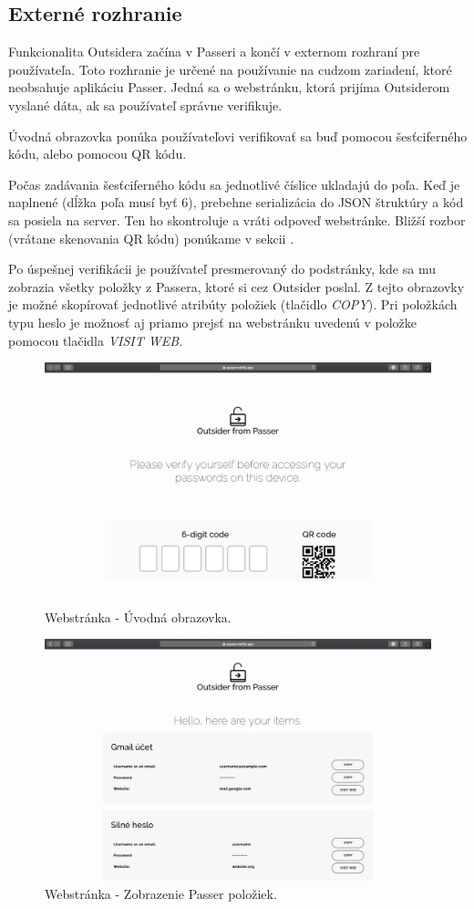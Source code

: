 \subsection{Externé rozhranie}
\label{webstranka}
Funkcionalita Outsidera začína v Passeri a končí v externom rozhraní pre používateľa. Toto rozhranie je určené na používanie na cudzom zariadení, ktoré neobsahuje aplikáciu Passer. Jedná sa o webstránku, ktorá prijíma Outsiderom vyslané dáta, ak sa používateľ správne verifikuje.

Úvodná obrazovka ponúka používateľovi verifikovať sa buď pomocou šesťciferného kódu, alebo pomocou QR kódu. 

Počas zadávania šesťciferného kódu sa jednotlivé číslice ukladajú do poľa. Keď je naplnené (dĺžka poľa musí byť 6), prebehne serializácia do JSON štruktúry a kód sa posiela na server. Ten ho skontroluje a vráti odpoveď webstránke. Bližší rozbor (vrátane skenovania QR kódu) ponúkame v sekcii .

Po úspešnej verifikácii je používateľ presmerovaný do podstránky, kde sa mu zobrazia všetky položky z Passera, ktoré si cez Outsider poslal. Z tejto obrazovky je možné skopírovať jednotlivé atribúty položiek (tlačidlo \textit{COPY}). Pri položkách typu heslo je možnosť aj priamo prejsť na webstránku uvedenú v položke pomocou tlačidla \textit{VISIT WEB}. 

\begin{figure}[ht]
  \centering
  \includegraphics[width=15cm]{img/website1.png}
  \caption{Webstránka - Úvodná obrazovka.}
  \label{website1}
\end{figure}

\begin{figure}[H]
  \centering
  \includegraphics[width=15cm]{img/website2.png}
  \caption{Webstránka - Zobrazenie Passer položiek.}
  \label{website2}
\end{figure}